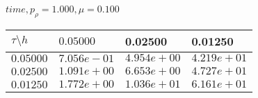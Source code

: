 
 $ time, p_{\rho}=1.000, \mu = 0.100 $ \\ 
\begin{tabular}{|p{0.6in}|p{1.2in}|p{1.2in}|p{1.2in}|} \hline
$\tau\setminus h$ & $0.05000 $ & 0.02500 & 0.01250 \\ \hline
$0.05000$ & $7.056e-01$ &$4.954e+00$ &$4.219e+01$  \\ \hline
$0.02500$ & $1.091e+00$ &$6.653e+00$ &$4.727e+01$  \\ \hline
$0.01250$ & $1.772e+00$ &$1.036e+01$ &$6.161e+01$  \\ \hline
\end{tabular}\\[20pt]
